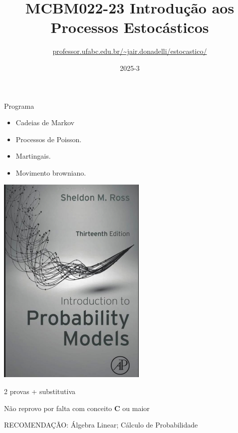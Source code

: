 \documentclass{beamer}
\title{MCBM022-23 Introdução aos Processos Estocásticos}
\subtitle{\url{professor.ufabc.edu.br/~jair.donadelli/estocastico/}}
\date{2025-3}
\begin{document}
\frame{\titlepage}

\begin{frame}{Programa}

  \begin{minipage}[h]{.45\linewidth}
    
    \begin{itemize}
    \item Cadeias de Markov 
    \item Processos de Poisson. 
    \item Martingais. 
    \item Movimento browniano.
    \end{itemize}
    
  \end{minipage}
  \begin{minipage}[h]{.45\linewidth}

    \includegraphics[scale=.3]{livro.png}
    
  \end{minipage}

  
  \vfill

  2 provas + substitutiva
  
  \vfill

  Não reprovo por falta com conceito \textbf{C} ou maior
  
  \vfill

 
  RECOMENDAÇÃO: Álgebra Linear; Cálculo de Probabilidade 
  
\end{frame}
\end{document}
